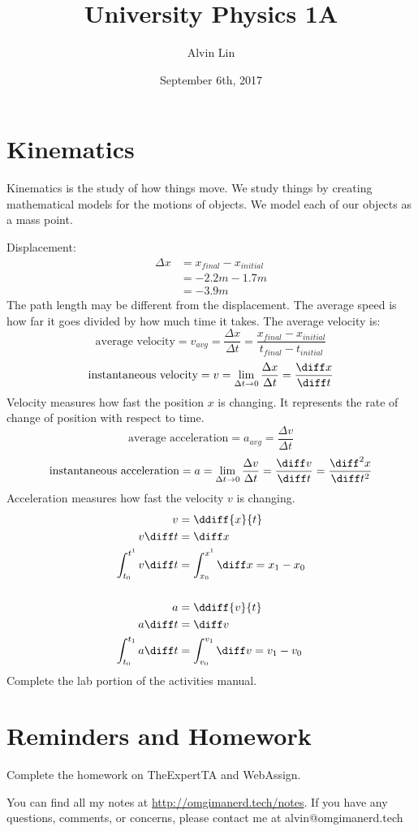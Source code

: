 \documentclass[letterpaper, 12pt]{math}
\title{University Physics 1A}
\author{Alvin Lin}
\date{September 6th, 2017}
\begin{document}
\maketitle

\section*{Kinematics}
Kinematics is the study of how things move. We study things by creating
mathematical models for the motions of objects. We model each of our objects
as a mass point.
\begin{center}
\end{center}
Displacement:
\begin{align*}
  \Delta x &= x_{final}-x_{initial} \\
  &= -2.2m-1.7m \\
  &= -3.9m
\end{align*}
The path length may be different from the displacement. The average speed is
how far it goes divided by how much time it takes. The average velocity is:
\[ \text{average velocity} = v_{avg} = \frac{\Delta x}{\Delta t} =
  \frac{x_{final}-x_{initial}}{t_{final}-t_{initial}} \]
\[ \text{instantaneous velocity} = v = \lim_{\Delta t\to0}\frac{\Delta x}
  {\Delta t} = \frac{\diff x}{\diff t} \]
Velocity measures how fast the position \( x \) is changing. It represents the
rate of change of position with respect to time.
\[ \text{average acceleration} = a_{avg} = \frac{\Delta v}{\Delta t} \]
\[ \text{instantaneous acceleration} = a = \lim_{\Delta t\to0}\frac{\Delta v}
  {\Delta t} = \frac{\diff v}{\diff t} = \frac{\diff^2 x}{\diff t^2} \]
Acceleration measures how fast the velocity \( v \) is changing.
\begin{align*}
  v &= \ddiff{x}{t} \\
  v\diff t &= \diff x \\
  \int_{t_0}^{t^1}v\diff t &= \int_{x_0}^{x^1}\diff x = x_1-x_0 \\ \\
  a &= \ddiff{v}{t} \\
  a\diff t &= \diff v \\
  \int_{t_0}^{t_1}a\diff t &= \int_{v_0}^{v_1}\diff v = v_1-v_0
\end{align*}
Complete the lab portion of the activities manual.

\section*{Reminders and Homework}
Complete the homework on TheExpertTA and WebAssign.

\begin{center}
  You can find all my notes at \url{http://omgimanerd.tech/notes}. If you have
  any questions, comments, or concerns, please contact me at
  alvin@omgimanerd.tech
\end{center}
\end{document}
